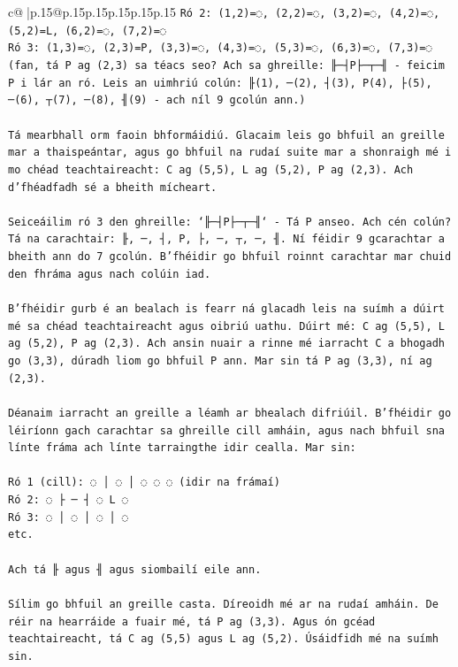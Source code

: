 \documentclass{article}
\begin{document}
{\begin{supertabular}{c@{$\;$}|p{.15\linewidth}@{}p{.15\linewidth}p{.15\linewidth}p{.15\linewidth}p{.15\linewidth}p{.15\linewidth}}
{{{\texttt{Ró 2: (1,2)=◌, (2,2)=◌, (3,2)=◌, (4,2)=◌, (5,2)=L, (6,2)=◌, (7,2)=◌} \\
\texttt{Ró 3: (1,3)=◌, (2,3)=P, (3,3)=◌, (4,3)=◌, (5,3)=◌, (6,3)=◌, (7,3)=◌  (fan, tá P ag (2,3) sa téacs seo? Ach sa ghreille: ╟─┤P├─┬─╢ {-} feicim P i lár an ró. Leis an uimhriú colún: ╟(1), ─(2), ┤(3), P(4), ├(5), ─(6), ┬(7), ─(8), ╢(9) {-} ach níl 9 gcolún ann.)} \\
\\ 
\texttt{Tá mearbhall orm faoin bhformáidiú. Glacaim leis go bhfuil an greille mar a thaispeántar, agus go bhfuil na rudaí suite mar a shonraigh mé i mo chéad teachtaireacht: C ag (5,5), L ag (5,2), P ag (2,3). Ach d'fhéadfadh sé a bheith mícheart.} \\
\\ 
\texttt{Seiceáilim ró 3 den ghreille: `╟─┤P├─┬─╢` {-} Tá P anseo. Ach cén colún? Tá na carachtair: ╟, ─, ┤, P, ├, ─, ┬, ─, ╢. Ní féidir 9 gcarachtar a bheith ann do 7 gcolún. B'fhéidir go bhfuil roinnt carachtar mar chuid den fhráma agus nach colúin iad.} \\
\\ 
\texttt{B'fhéidir gurb é an bealach is fearr ná glacadh leis na suímh a dúirt mé sa chéad teachtaireacht agus oibriú uathu. Dúirt mé: C ag (5,5), L ag (5,2), P ag (2,3). Ach ansin nuair a rinne mé iarracht C a bhogadh go (3,3), dúradh liom go bhfuil P ann. Mar sin tá P ag (3,3), ní ag (2,3).} \\
\\ 
\texttt{Déanaim iarracht an greille a léamh ar bhealach difriúil. B'fhéidir go léiríonn gach carachtar sa ghreille cill amháin, agus nach bhfuil sna línte fráma ach línte tarraingthe idir cealla. Mar sin:} \\
\\ 
\texttt{Ró 1 (cill): ◌ │ ◌ │ ◌ ◌ ◌  (idir na frámaí)} \\
\texttt{Ró 2: ◌ ├ ─ ┤ ◌ L ◌} \\
\texttt{Ró 3: ◌ │ ◌ │ ◌ │ ◌} \\
\texttt{etc.} \\
\\ 
\texttt{Ach tá ╟ agus ╢ agus siombailí eile ann.} \\
\\ 
\texttt{Sílim go bhfuil an greille casta. Díreoidh mé ar na rudaí amháin. De réir na hearráide a fuair mé, tá P ag (3,3). Agus ón gcéad teachtaireacht, tá C ag (5,5) agus L ag (5,2). Úsáidfidh mé na suímh sin.} \\
\\ 
}}}
\end{supertabular}}
\end{document}
